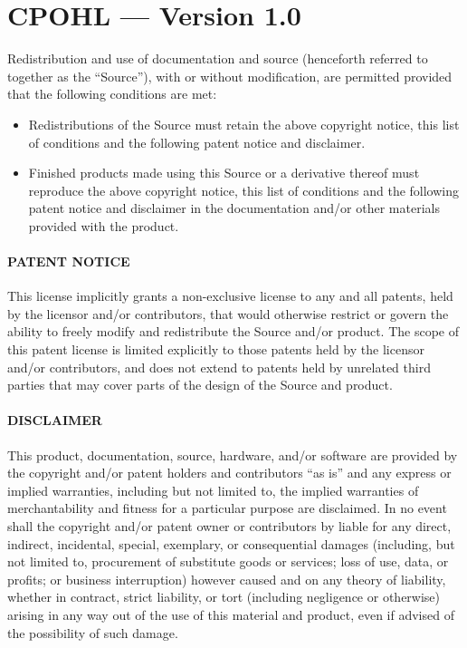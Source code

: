 \documentclass[letterpaper,twocolumn,10pt,openany,oneside,final,fleqn]{memoir}
\begin{document}
\section{CPOHL --- Version 1.0}

Redistribution and use of documentation and source (henceforth referred
to together as the ``Source''), with or without modification, are
permitted provided that the following conditions are met:

\begin{itemize}
    \item{Redistributions of the Source must retain the above copyright
notice, this list of conditions and the following patent notice
and disclaimer.}
    \item{Finished products made using this Source or a derivative thereof
must reproduce the above copyright notice, this list of conditions
and the following patent notice and disclaimer in the
documentation and/or other materials provided with the product.}
\end{itemize}

\paragraph{PATENT NOTICE}
This license implicitly grants a non-exclusive license to any and all
patents, held by the licensor and/or contributors, that would otherwise
restrict or govern the ability to freely modify and redistribute the
Source and/or product.  The scope of this patent license is limited
explicitly to those patents held by the licensor and/or contributors,
and does not extend to patents held by unrelated third parties that may
cover parts of the design of the Source and product.

\paragraph{DISCLAIMER}
This product, documentation, source, hardware, and/or software are
provided by the copyright and/or patent holders and contributors ``as is''
and any express or implied warranties, including but not limited to, the
implied warranties of merchantability and fitness for a particular
purpose are disclaimed. In no event shall the copyright and/or patent
owner or contributors by liable for any direct, indirect, incidental,
special, exemplary, or consequential damages (including, but not limited
to, procurement of substitute goods or services; loss of use, data, or
profits; or business interruption) however caused and on any theory of
liability, whether in contract, strict liability, or tort (including
negligence or otherwise) arising in any way out of the use of this
material and product, even if advised of the possibility of such damage.
\end{document}
